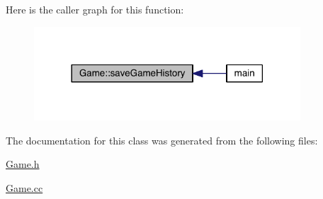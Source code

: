 Here is the caller graph for this function\+:\nopagebreak
\begin{figure}[H]
\begin{center}
\leavevmode
\includegraphics[width=282pt]{a00030_a2f5e0edfe4122b7619ef39ca0a1abad4_icgraph}
\end{center}
\end{figure}




The documentation for this class was generated from the following files\+:\begin{DoxyCompactItemize}
\item 
\hyperlink{a00106}{Game.\+h}\item 
\hyperlink{a00105}{Game.\+cc}\end{DoxyCompactItemize}

